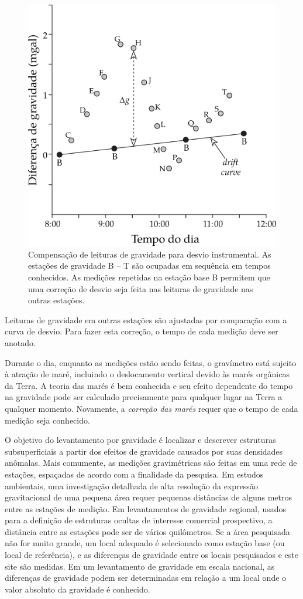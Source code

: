 \documentclass[]{book}
\theoremstyle{definition}
\theoremstyle{definition}
\theoremstyle{definition}
\theoremstyle{remark}
\begin{document}
\begin{figure}

{\centering \includegraphics[width=0.4\linewidth]{fig/Fig_02.28} 

}

\caption{Compensação de leituras de gravidade para desvio instrumental. As estações de gravidade B – T são ocupadas em sequência em tempos conhecidos. As medições repetidas na estação base B permitem que uma correção de desvio seja feita nas leituras de gravidade nas outras estações.}\label{fig:drift}
\end{figure}

Leituras de gravidade em outras estações são ajustadas por comparação com a curva de desvio. Para fazer esta correção, o tempo de cada medição deve ser anotado.

Durante o dia, enquanto as medições estão sendo feitas, o gravímetro está sujeito à atração de maré, incluindo o deslocamento vertical devido às marés orgânicas da Terra. A teoria das marés é bem conhecida e seu efeito dependente do tempo na gravidade pode ser calculado precisamente para qualquer lugar na Terra a qualquer momento. Novamente, a \emph{correção das marés} requer que o tempo de cada medição seja conhecido.

O objetivo do levantamento por gravidade é localizar e descrever estruturas subsuperficiais a partir dos efeitos de gravidade causados por suas densidades anômalas. Mais comumente, as medições gravimétricas são feitas em uma rede de estações, espaçadas de acordo com a finalidade da pesquisa. Em estudos ambientais, uma investigação detalhada de alta resolução da expressão gravitacional de uma pequena área requer pequenas distâncias de alguns metros entre as estações de medição. Em levantamentos de gravidade regional, usados para a definição de estruturas ocultas de interesse comercial prospectivo, a distância entre as estações pode ser de vários quilômetros. Se a área pesquisada não for muito grande, um local adequado é selecionado como estação base (ou local de referência), e as diferenças de gravidade entre os locais pesquisados e este site são medidas. Em um levantamento de gravidade em escala nacional, as diferenças de gravidade podem ser determinadas em relação a um local onde o valor absoluto da gravidade é conhecido.
\end{document}
